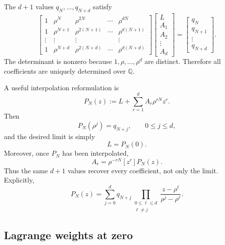 \documentclass[11pt]{article}
\newcommand{\Q}{\mathbb{Q}}
\begin{document}
The $d+1$ values $q_N,\ldots,q_{N+d}$ satisfy
\begin{equation}
 \begin{bmatrix}
 1&\rho^N&\rho^{2N}&\cdots&\rho^{dN}\\
 1&\rho^{N+1}&\rho^{2(N+1)}&\cdots&\rho^{d(N+1)}\\
 \vdots&\vdots&\vdots&&\vdots\\
 1&\rho^{N+d}&\rho^{2(N+d)}&\cdots&\rho^{d(N+d)}
 \end{bmatrix}
 \begin{bmatrix}L\\A_1\\A_2\\\vdots\\A_d\end{bmatrix}
 =
 \begin{bmatrix}q_N\\q_{N+1}\\\vdots\\q_{N+d}\end{bmatrix}.
 \label{eq:vandermonde-system}
\end{equation}
The determinant is nonzero because $1,\rho,\ldots,\rho^d$ are distinct.
Therefore all coefficients are uniquely determined over $\Q$.

A useful interpolation reformulation is
\begin{equation}
 P_N(z):=L+\sum_{r=1}^{d}A_r\rho^{rN}z^r.
 \label{eq:PN}
\end{equation}
Then
\begin{equation}
 P_N(\rho^j)=q_{N+j},
 \qquad 0\le j\le d,
 \label{eq:PN-samples}
\end{equation}
and the desired limit is simply
\begin{equation}
 L=P_N(0).
 \label{eq:L-P0}
\end{equation}
Moreover, once $P_N$ has been interpolated,
\begin{equation}
 A_r=\rho^{-rN}[z^r]P_N(z).
 \label{eq:all-Ar}
\end{equation}
Thus the same $d+1$ values recover every coefficient, not only the limit.
Explicitly,
\begin{equation}
 P_N(z)=\sum_{j=0}^{d}q_{N+j}
 \prod_{\substack{0\le\ell\le d\\\ell\ne j}}
 \frac{z-\rho^\ell}{\rho^j-\rho^\ell}.
 \label{eq:lagrange-P}
\end{equation}

\subsection{Lagrange weights at zero}
\end{document}
